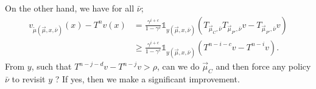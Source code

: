 \documentclass{article}
\def\1{{\mathds 1}}
\begin{document}
On the other hand, we have for all $\bar\nu$;
\begin{align}
  v_{\tilde\mu(\vec\mu,x,\bar\nu)}(x) - T^n v(x) & = \frac{\gamma^{i+c}}{1-\gamma^c} \1_{y(\vec\mu,x,\bar\nu)}  (T_{\vec\mu_C,\bar\nu}T_{\vec\mu_{P'},\bar\nu} v  - T_{\vec\mu_{P'},\bar\nu} v) \\
  & \ge  \frac{\gamma^{i+c}}{1-\gamma^c} \1_{y(\vec\mu,x,\bar\nu)}  (T^{n-i-c}v - T^{n-i}v).
\end{align}
From $y$, such that $T^{n-j-d}v -T^{n-j}v > \rho$, can we do $\vec\mu_C$ and then force any policy $\bar\nu$ to revisit $y$ ? If yes, then we make a significant improvement.






\end{document}
